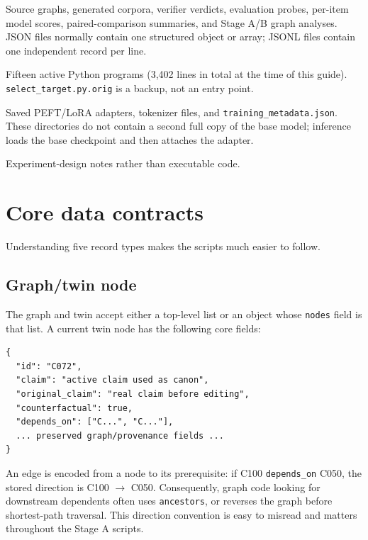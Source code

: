 \documentclass[11pt]{article}
\begin{document}
\begin{description}[style=nextline,leftmargin=0pt]
  \item[\texttt{data/}]
  Source graphs, generated corpora, verifier verdicts, evaluation probes,
  per-item model scores, paired-comparison summaries, and Stage A/B graph
  analyses.  JSON files normally contain one structured object or array; JSONL
  files contain one independent record per line.

  \item[\texttt{scripts/}]
  Fifteen active Python programs (3,402 lines in total at the time of this
  guide).  \texttt{select\_target.py.orig} is a backup, not an entry point.

  \item[\texttt{injected\_zephyr\_lora* /}]
  Saved PEFT/LoRA adapters, tokenizer files, and
  \texttt{training\_metadata.json}.  These directories do not contain a second
  full copy of the base model; inference loads the base checkpoint and then
  attaches the adapter.

  \item[\texttt{codex\_agent\_contexts/}]
  Experiment-design notes rather than executable code.
\end{description}

\section{Core data contracts}

Understanding five record types makes the scripts much easier to follow.

\subsection{Graph/twin node}

The graph and twin accept either a top-level list or an object whose
\texttt{nodes} field is that list.  A current twin node has the following core
fields:

\begin{lstlisting}
{
  "id": "C072",
  "claim": "active claim used as canon",
  "original_claim": "real claim before editing",
  "counterfactual": true,
  "depends_on": ["C...", "C..."],
  ... preserved graph/provenance fields ...
}
\end{lstlisting}

An edge is encoded from a node to its prerequisite: if C100
\texttt{depends\_on} C050, the stored direction is C100 $\rightarrow$ C050.
Consequently, graph code looking for downstream dependents often uses
\texttt{ancestors}, or reverses the graph before shortest-path traversal.  This
direction convention is easy to misread and matters throughout the Stage A
scripts.
\end{document}

